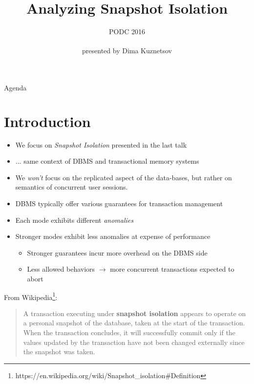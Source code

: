 \documentclass{beamer}
\title[Analyzing Snapshot Isolation] %
{Analyzing Snapshot Isolation}
\author[Andrea Cerone, Alexey Gotsman] %
{\textit{Andrea Cerone \and Alexey Gotsman}}
\institute[IMDEA] %
{IMDEA Software Institute}
\date[PODC 2016] %
{PODC 2016 \\ \hfill \\ \footnotesize presented by Dima Kuznetsov}
\begin{document}
\begin{frame}
	\titlepage
\end{frame}

\begin{frame}{Agenda}
	\tableofcontents
\end{frame}

\section{Introduction}

\begin{frame}
	\begin{itemize}
		\item We focus on \emph{Snapshot Isolation} presented in the last talk
		\item ... same context of DBMS and transactional memory systems
		\item We \textit{won't} focus on the replicated aspect of the data-bases, but rather on semantics of concurrent user sessions.
	\end{itemize}
\end{frame}

\begin{frame}
	\begin{itemize}
		\item DBMS typically offer various guarantees for transaction management
		\item Each mode exhibits different \emph{anomalies}
		\item Stronger modes exhibit less anomalies at expense of performance
		\begin{itemize}
			\item Stronger guarantees incur more overhead on the DBMS side
			\item Less allowed behaviors $ \rightarrow $ more concurrent transactions expected to abort
		\end{itemize}
	\end{itemize}
\end{frame}

\begin{frame}
	From Wikipedia\footnote{https://en.wikipedia.org/wiki/Snapshot\_isolation\#Definition}: \\
	\begin{quotation}
		A transaction executing under \textbf{snapshot isolation} appears to operate on a personal snapshot of the database, taken at the start of the transaction. When the transaction concludes, it will successfully commit only if the values updated by the transaction have not been changed externally since the snapshot was taken.
	\end{quotation}
\end{frame}
\end{document}

